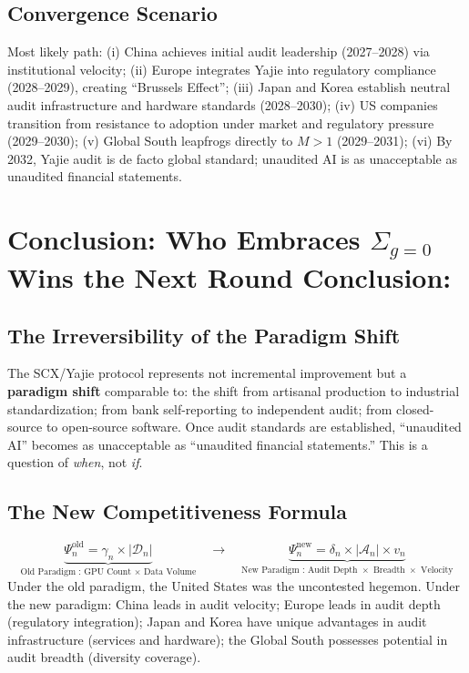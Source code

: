 \documentclass[11pt,a4paper]{article}
\theoremstyle{definition}
\theoremstyle{remark}
\newcommand{\cA}{\mathcal{A}}
\newcommand{\cD}{\mathcal{D}}
\newcommand{\auditDepth}{\delta}
\newcommand{\gpuScale}{\gamma}
\newcommand{\sumGZero}{\Sigma_{g=0}}
\newcommand{\competitiveness}{\Psi}
\newcommand{\MAmany}{M>1}
\begin{document}
\subsection{Convergence Scenario}
Most likely path: (i) China achieves initial audit leadership (2027--2028) via institutional velocity; (ii) Europe integrates Yajie into regulatory compliance (2028--2029), creating ``Brussels Effect''; (iii) Japan and Korea establish neutral audit infrastructure and hardware standards (2028--2030); (iv) US companies transition from resistance to adoption under market and regulatory pressure (2029--2030); (v) Global South leapfrogs directly to $\MAmany$ (2029--2031); (vi) By 2032, Yajie audit is de facto global standard; unaudited AI is as unacceptable as unaudited financial statements.
\section{Conclusion: Who Embraces $\sumGZero$ Wins the Next Round Conclusion:}
\label{sec:conclusion}
\subsection{The Irreversibility of the Paradigm Shift}
The SCX/Yajie protocol represents not incremental improvement but a \textbf{paradigm shift} comparable to: the shift from artisanal production to industrial standardization; from bank self-reporting to independent audit; from closed-source to open-source software. Once audit standards are established, ``unaudited AI'' becomes as unacceptable as ``unaudited financial statements.'' This is a question of \textit{when}, not \textit{if}.
\subsection{The New Competitiveness Formula}
\begin{equation}
    \underbrace{\competitiveness_n^{\text{old}} = \gpuScale_n \times |\cD_n|}_{\text{Old Paradigm : GPU Count $\times$ Data Volume}}
    \quad \longrightarrow \quad
    \underbrace{\competitiveness_n^{\text{new}} = \auditDepth_n \times |\cA_n| \times v_n}_{\text{New Paradigm : Audit Depth $\times$ Breadth $\times$ Velocity}}
    \label{eq:paradigm_shift}
\end{equation}
Under the old paradigm, the United States was the uncontested hegemon. Under the new paradigm: China leads in audit velocity; Europe leads in audit depth (regulatory integration); Japan and Korea have unique advantages in audit infrastructure (services and hardware); the Global South possesses potential in audit breadth (diversity coverage).
\end{document}
